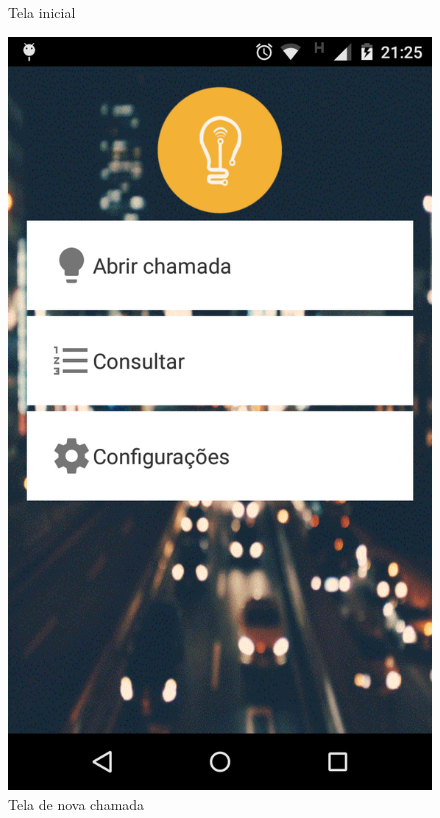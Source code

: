 \documentclass[
	article,			%
	11pt,				%
	oneside,			%
	a4paper,			%
	english,			%
	brazil,				%
	sumario=tradicional
	]{abntex2}
\begin{document}
\begin{figure}[!htbp]
 \centering
  \begin{minipage}{0.4\textwidth}
    \centering
    \caption{\label{android-tela-inicial}Tela inicial}
    \includegraphics[scale=0.1]{android/1.png}
  \end{minipage}
  \hfill
  \begin{minipage}{0.4\textwidth}
    \centering
    \caption{\label{android-tela-nova-chamada}Tela de nova chamada}

\end{minipage}
\end{figure}
\end{document}
